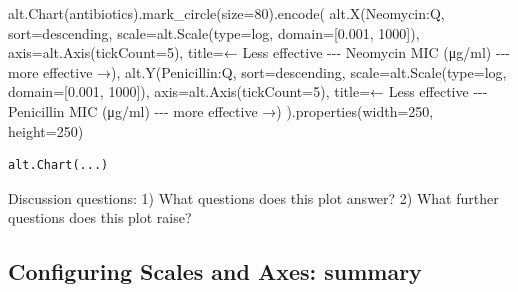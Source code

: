 \documentclass[
  letterpaper,
  DIV=11,
  numbers=noendperiod]{scrartcl}
\newenvironment{Shaded}{\begin{snugshade}}{\end{snugshade}}
\newcommand{\BuiltInTok}[1]{\textcolor[rgb]{0.00,0.23,0.31}{#1}}
\newcommand{\DecValTok}[1]{\textcolor[rgb]{0.68,0.00,0.00}{#1}}
\newcommand{\FloatTok}[1]{\textcolor[rgb]{0.68,0.00,0.00}{#1}}
\newcommand{\NormalTok}[1]{\textcolor[rgb]{0.00,0.23,0.31}{#1}}
\newcommand{\OperatorTok}[1]{\textcolor[rgb]{0.37,0.37,0.37}{#1}}
\newcommand{\StringTok}[1]{\textcolor[rgb]{0.13,0.47,0.30}{#1}}
\begin{document}
\begin{Shaded}
\begin{Highlighting}[]
\NormalTok{alt.Chart(antibiotics).mark\_circle(size}\OperatorTok{=}\DecValTok{80}\NormalTok{).encode(}
\NormalTok{    alt.X(}\StringTok{\textquotesingle{}Neomycin:Q\textquotesingle{}}\NormalTok{,}
\NormalTok{          sort}\OperatorTok{=}\StringTok{\textquotesingle{}descending\textquotesingle{}}\NormalTok{,}
\NormalTok{          scale}\OperatorTok{=}\NormalTok{alt.Scale(}\BuiltInTok{type}\OperatorTok{=}\StringTok{\textquotesingle{}log\textquotesingle{}}\NormalTok{, domain}\OperatorTok{=}\NormalTok{[}\FloatTok{0.001}\NormalTok{, }\DecValTok{1000}\NormalTok{]),}
\NormalTok{          axis}\OperatorTok{=}\NormalTok{alt.Axis(tickCount}\OperatorTok{=}\DecValTok{5}\NormalTok{),}
\NormalTok{          title}\OperatorTok{=}\StringTok{\textquotesingle{}← Less effective {-}{-}{-} Neomycin MIC (μg/ml) {-}{-}{-} more effective →\textquotesingle{}}\NormalTok{),}
\NormalTok{    alt.Y(}\StringTok{\textquotesingle{}Penicillin:Q\textquotesingle{}}\NormalTok{,}
\NormalTok{          sort}\OperatorTok{=}\StringTok{\textquotesingle{}descending\textquotesingle{}}\NormalTok{,}
\NormalTok{          scale}\OperatorTok{=}\NormalTok{alt.Scale(}\BuiltInTok{type}\OperatorTok{=}\StringTok{\textquotesingle{}log\textquotesingle{}}\NormalTok{, domain}\OperatorTok{=}\NormalTok{[}\FloatTok{0.001}\NormalTok{, }\DecValTok{1000}\NormalTok{]),}
\NormalTok{          axis}\OperatorTok{=}\NormalTok{alt.Axis(tickCount}\OperatorTok{=}\DecValTok{5}\NormalTok{),}
\NormalTok{          title}\OperatorTok{=}\StringTok{\textquotesingle{}← Less effective {-}{-}{-} Penicillin MIC (μg/ml) {-}{-}{-} more effective →\textquotesingle{}}\NormalTok{)}
\NormalTok{).properties(width}\OperatorTok{=}\DecValTok{250}\NormalTok{, height}\OperatorTok{=}\DecValTok{250}\NormalTok{)}
\end{Highlighting}
\end{Shaded}

\begin{verbatim}
alt.Chart(...)
\end{verbatim}

Discussion questions: 1) What questions does this plot answer? 2) What
further questions does this plot raise?

\subsection{Configuring Scales and Axes:
summary}\label{configuring-scales-and-axes-summary}
\end{document}
